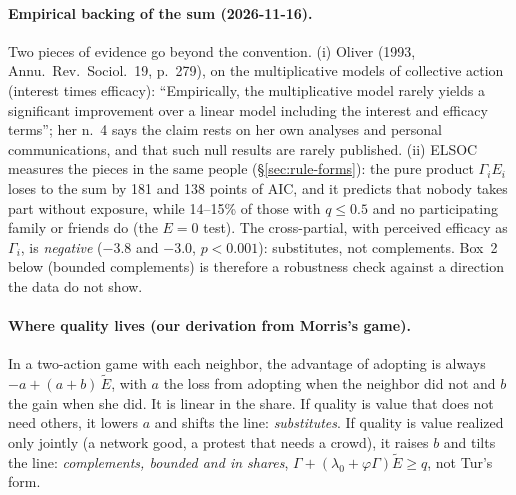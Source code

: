 \documentclass[11pt,a4paper]{article}
\newcommand{\Ee}{\tilde{E}}                 %
\begin{document}
\paragraph{Empirical backing of the sum (2026-11-16).} Two pieces of evidence go beyond the convention.
(i) Oliver (1993, Annu.\ Rev.\ Sociol.\ 19, p.~279), on the multiplicative models of collective
action (interest times efficacy): ``Empirically, the multiplicative model rarely yields a significant
improvement over a linear model including the interest and efficacy terms''; her n.~4 says the claim
rests on her own analyses and personal communications, and that such null results are rarely
published. (ii) ELSOC measures the pieces in the same people (\S\ref{sec:rule-forms}): the pure
product $\Gamma_i E_i$ loses to the sum by 181 and 138 points of AIC, and it predicts that nobody takes
part without exposure, while 14--15\% of those with $q \le 0.5$ and no participating family or friends do
(the $E = 0$ test). The cross-partial, with perceived efficacy as $\Gamma_i$, is \emph{negative}
($-3.8$ and $-3.0$, $p < 0.001$): substitutes, not complements. Box~2 below (bounded complements) is
therefore a robustness check against a direction the data do not show.

\paragraph{Where quality lives (our derivation from Morris's game).} In a two-action game
with each neighbor, the advantage of adopting is always $-a + (a + b)\,\Ee$, with $a$ the loss
from adopting when the neighbor did not and $b$ the gain when she did. It is linear in the
share. If quality is value that does not need others, it lowers $a$ and shifts the line:
\emph{substitutes}. If quality is value realized only jointly (a network good, a protest that
needs a crowd), it raises $b$ and tilts the line: \emph{complements, bounded and in shares},
$\Gamma + (\lambda_0 + \varphi\Gamma)\Ee \ge q$, not Tur's form.
\end{document}
